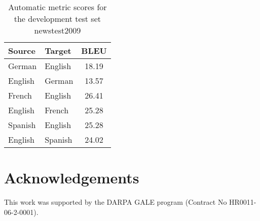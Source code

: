 \documentclass[11pt, a4paper]{article}
\begin{document}
\begin{table}[h]
\begin{center}
\begin{tabular}{|l|l||c|}
\hline
\bf Source & \bf Target & \bf BLEU  \\
\hline
German & English & 18.19  \\ \hline
English & German & 13.57 \\ \hline
French & English & 26.41 \\ \hline
English & French & 25.28 \\ \hline
Spanish & English & 25.28 \\ \hline
English & Spanish & 24.02  \\ \hline
\end{tabular}
\end{center}
\caption{\label{devtest-scores} Automatic metric scores for the development test set newstest2009}
\end{table}





\section*{Acknowledgements}
This work was supported by the DARPA GALE program (Contract No HR0011-06-2-0001).







\end{document}
